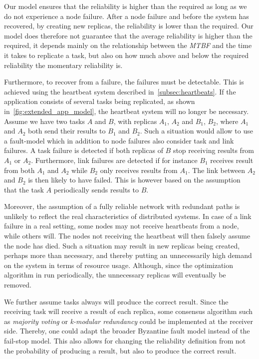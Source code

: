 \documentclass{cslthse-msc}
\begin{document}
Our model ensures that the reliability is higher than the required as long as we do not experience a node failure. After a node failure and before the system has recovered, by creating new replicas, the reliability is lower than the required. Our model does therefore not guarantee that the average reliability is higher than the required, it depends mainly on the relationship between the \emph{MTBF} and the time it takes to replicate a task, but also on how much above and below the required reliability the momentary reliability is.

Furthermore, to recover from a failure, the failures must be detectable. This is achieved using the heartbeat system described in~\cref{subsec:heartbeats}. If the application consists of several tasks being replicated, as shown in~\cref{fig:extended_app_model}, the heartbeat system will no longer be necessary. Assume we have two tasks $A$ and $B$, with replicas $A_1$, $A_2$ and $B_1$, $B_2$, where $A_1$ and $A_2$ both send their results to $B_1$ and $B_2$. Such a situation would allow to use a fault-model which in addition to node failures also consider task and link failures. A task failure is detected if both replicas of $B$ stop receiving results from $A_1$ or $A_2$. Furthermore, link failures are detected if for instance $B_1$ receives result from both $A_1$ and $A_2$ while $B_2$ only receives results from $A_1$. The link between $A_2$ and $B_2$ is then likely to have failed. This is however based on the assumption that the task $A$ periodically sends results to $B$.

Moreover, the assumption of a fully reliable network with redundant paths is unlikely to reflect the real characteristics of distributed systems. In case of a link failure in a real setting, some nodes may not receive heartbeats from a node, while others will. The nodes not receiving the heartbeat will then falsely assume the node has died. Such a situation may result in new replicas being created, perhaps more than necessary, and thereby putting an unnecessarily high demand on the system in terms of resource usage. Although, since the optimization algorithm in run periodically, the unnecessary replicas will eventually be removed.

We further assume tasks always will produce the correct result. Since the receiving task will receive a result of each replica, some consensus algorithm such as \emph{majority voting} or \emph{k-modular redundancy} could be implemented at the receiver side. Thereby, one could adapt the broader Byzantine fault model instead of the fail-stop model. This also allows for changing the reliability definition from not the probability of producing a result, but also to produce the correct result.
\end{document}
